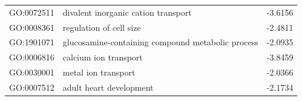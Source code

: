 \documentclass[11pt,twoside,a4paper]{report}
\begin{document}
\begin{appendices}
\begin{longtable}{@{\extracolsep{\fill}}llc@{}}
    GO:0072511 & divalent inorganic cation transport                 & -3.6156       \\
    GO:0008361 & regulation of cell size                             & -2.4811       \\
    GO:1901071 & glucosamine-containing compound metabolic process   & -2.0935       \\
    GO:0006816 & calcium ion transport                               & -3.8459       \\
    GO:0030001 & metal ion transport                                 & -2.0366       \\
    GO:0007512 & adult heart development                             & -2.1734       \\
	\end{longtable}
	

\end{appendices}
\end{document}
